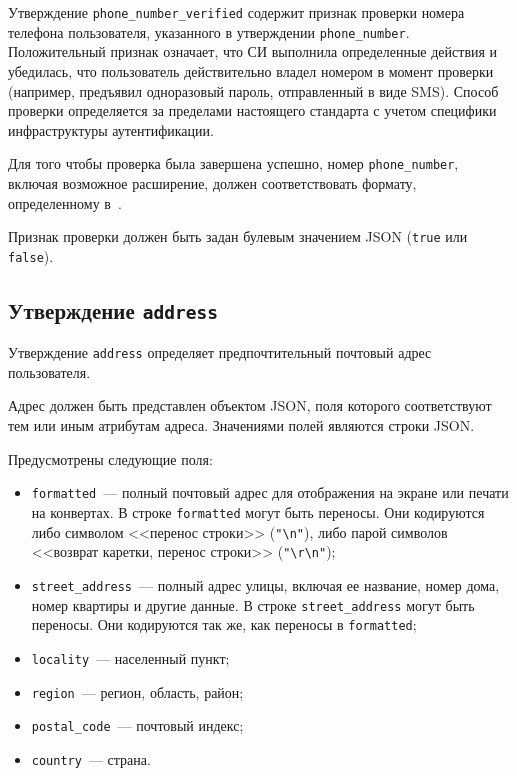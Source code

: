 Утверждение \lstinline{phone_number_verified} содержит признак проверки номера
телефона пользователя, указанного в утверждении \lstinline{phone_number}. 
%
Положительный признак означает, что СИ выполнила определенные действия и
убедилась, что пользователь действительно владел номером в момент проверки
(например, предъявил одноразовый пароль, отправленный в виде SMS).
%
Способ проверки определяется за пределами настоящего стандарта с учетом 
специфики инфраструктуры аутентификации.  

Для того чтобы проверка была завершена успешно, номер \lstinline{phone_number}, 
включая возможное расширение, должен соответствовать формату, определенному 
в~\cite{E-164,RFC3966}.  

Признак проверки должен быть задан булевым значением JSON
(\lstinline{true} или \lstinline{false}). 

\subsection{Утверждение \lstinline{address}}\label{CLAIMS.Address}

Утверждение \lstinline{address} определяет предпочтительный почтовый адрес пользователя. 

Адрес должен быть представлен объектом JSON, поля которого соответствуют тем 
или иным атрибутам адреса. Значениями полей являются строки JSON.

Предусмотрены следующие поля:
\begin{itemize}
\item
\lstinline{formatted}~---
полный почтовый адрес для отображения на экране или печати на конвертах.
%
В строке \lstinline{formatted} могут быть переносы. Они кодируются либо 
символом <<перенос строки>> (\lstinline{"\n"}), либо парой символов
<<возврат каретки, перенос строки>> (\lstinline{"\r\n"});

\item
\lstinline{street_address}~--- полный адрес улицы, включая
ее название, номер дома, номер квартиры и другие данные.
%
В строке \lstinline{street_address} могут быть переносы. Они кодируются так же,
как переносы в \lstinline{formatted};

\item
\lstinline{locality}~--- 
населенный пункт;

\item
\lstinline{region}~--- 
регион, область, район;
%

\item
\lstinline{postal_code}~--- 
почтовый индекс;

\item
\lstinline{country}~--- страна.
\end{itemize}

